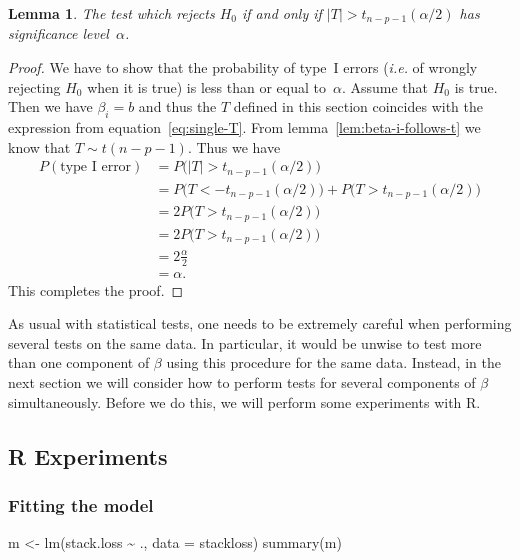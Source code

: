 \documentclass[
  a4paper,
]{article}
\newenvironment{Shaded}{\begin{snugshade}}{\end{snugshade}}
\newcommand{\AttributeTok}[1]{\textcolor[rgb]{0.77,0.63,0.00}{#1}}
\newcommand{\FunctionTok}[1]{\textcolor[rgb]{0.00,0.00,0.00}{#1}}
\newcommand{\NormalTok}[1]{#1}
\newcommand{\OtherTok}[1]{\textcolor[rgb]{0.56,0.35,0.01}{#1}}
\newcommand{\SpecialCharTok}[1]{\textcolor[rgb]{0.00,0.00,0.00}{#1}}
\newtheorem{lemma}{Lemma}[section]
\theoremstyle{definition}
\theoremstyle{definition}
\theoremstyle{definition}
\theoremstyle{definition}
\theoremstyle{remark}
\begin{document}
\begin{lemma}
\protect\hypertarget{lem:t-test}{}\label{lem:t-test}The test which rejects \(H_0\) if and only if \(|T| > t_{n-p-1}(\alpha/2)\)
has significance level~\(\alpha\).
\end{lemma}

\begin{proof}
We have to show that the probability of type~I errors (\emph{i.e.} of wrongly
rejecting \(H_0\) when it is true) is less than or equal to~\(\alpha\).
Assume that \(H_0\) is true. Then we have \(\beta_i = b\) and thus
the \(T\) defined in this section coincides with the expression from
equation~\eqref{eq:single-T}. From lemma~\ref{lem:beta-i-follows-t}
we know that \(T \sim t(n-p-1)\). Thus we have
\begin{align*}
  P( \mbox{type I error} )
  &= P\bigl( |T| > t_{n-p-1}(\alpha/2) \bigr) \\
  &= P\bigl(T < -t_{n-p-1}(\alpha/2) \bigr) + P\bigl(T > t_{n-p-1}(\alpha/2) \bigr) \\
  &= 2 P\bigl(T > t_{n-p-1}(\alpha/2) \bigr) \\
  &= 2 P\bigl(T > t_{n-p-1}(\alpha/2) \bigr) \\
  &= 2 \frac{\alpha}{2} \\
  &= \alpha.
\end{align*}
This completes the proof.
\end{proof}

As usual with statistical tests, one needs to be extremely careful when
performing several tests on the same data. In particular, it would be
unwise to test more than one component of \(\beta\) using this procedure
for the same data. Instead, in the next section we will consider how
to perform tests for several components of \(\beta\) simultaneously.
Before we do this, we will perform some experiments with R.

\hypertarget{r-experiments}{%
\subsection{R Experiments}\label{r-experiments}}

\hypertarget{fitting-the-model}{%
\subsubsection{Fitting the model}\label{fitting-the-model}}

\begin{Shaded}
\begin{Highlighting}[]
\NormalTok{m }\OtherTok{\textless{}{-}} \FunctionTok{lm}\NormalTok{(stack.loss }\SpecialCharTok{\textasciitilde{}}\NormalTok{ ., }\AttributeTok{data =}\NormalTok{ stackloss)}
\FunctionTok{summary}\NormalTok{(m)}
\end{Highlighting}
\end{Shaded}
\end{document}
